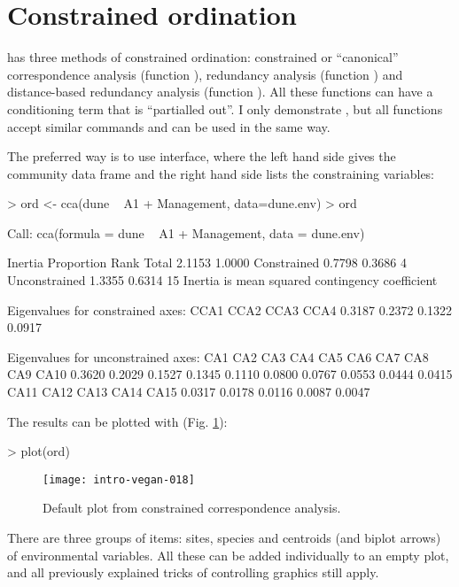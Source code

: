 \documentclass[a4paper,10pt]{article}
\begin{document}
\section{Constrained ordination}

 has three methods of constrained ordination:
constrained or ``canonical'' correspondence analysis (function
), redundancy analysis (function ) and
distance-based redundancy analysis (function ).  All
these functions can have a conditioning term that is ``partialled
out''.  I only demonstrate , but all functions accept
similar commands and can be used in the same way.

The preferred way is to use  interface, where the left
hand side gives the community data frame and the right hand side lists
the constraining variables:
\begin{Schunk}
\begin{Sinput}
> ord <- cca(dune ~ A1 + Management, data=dune.env)
> ord
\end{Sinput}
\begin{Soutput}
Call: cca(formula = dune ~ A1 + Management, data = dune.env)

              Inertia Proportion Rank
Total          2.1153     1.0000     
Constrained    0.7798     0.3686    4
Unconstrained  1.3355     0.6314   15
Inertia is mean squared contingency coefficient 

Eigenvalues for constrained axes:
  CCA1   CCA2   CCA3   CCA4 
0.3187 0.2372 0.1322 0.0917 

Eigenvalues for unconstrained axes:
   CA1    CA2    CA3    CA4    CA5    CA6    CA7    CA8    CA9   CA10 
0.3620 0.2029 0.1527 0.1345 0.1110 0.0800 0.0767 0.0553 0.0444 0.0415 
  CA11   CA12   CA13   CA14   CA15 
0.0317 0.0178 0.0116 0.0087 0.0047 
\end{Soutput}
\end{Schunk}
The results can be plotted with (Fig. \ref{fig:cca}):
\begin{Schunk}
\begin{Sinput}
> plot(ord)
\end{Sinput}
\end{Schunk}
\begin{figure}
\texttt{[image: intro-vegan-018]}
\caption{Default plot from constrained correspondence analysis.}
\label{fig:cca}
\end{figure}
There are three groups of items: sites, species and centroids (and
biplot arrows) of environmental variables.  All these can be added
individually to an empty plot, and all previously explained tricks of
controlling graphics still apply.
\end{document}
